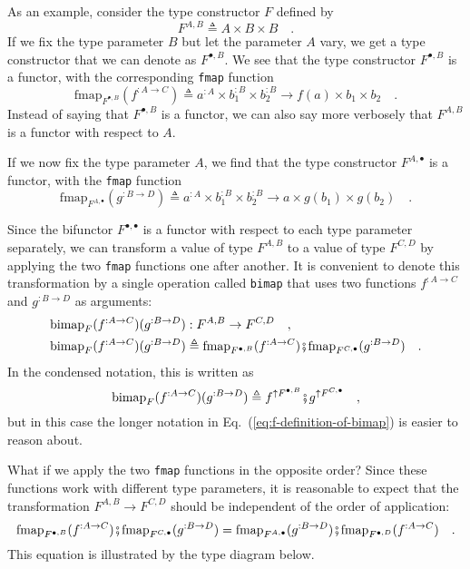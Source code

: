 As an example, consider the type constructor $F$ defined by
\[
F^{A,B}\triangleq A\times B\times B\quad.
\]
If we fix the type parameter $B$ but let the parameter $A$ vary,
we get a type constructor that we can denote as $F^{\bullet,B}$.
We see that the type constructor $F^{\bullet,B}$ is a functor, with
the corresponding \lstinline!fmap! function
\[
\text{fmap}_{F^{\bullet,B}}(f^{:A\rightarrow C})\triangleq a^{:A}\times b_{1}^{:B}\times b_{2}^{:B}\rightarrow f(a)\times b_{1}\times b_{2}\quad.
\]
Instead of saying that $F^{\bullet,B}$ is a functor, we can also
say more verbosely that $F^{A,B}$ is a functor with respect to $A$. 

If we now fix the type parameter $A$, we find that the type constructor
$F^{A,\bullet}$ is a functor, with the \lstinline!fmap! function
\[
\text{fmap}_{F^{A,\bullet}}(g^{:B\rightarrow D})\triangleq a^{:A}\times b_{1}^{:B}\times b_{2}^{:B}\rightarrow a\times g(b_{1})\times g(b_{2})\quad.
\]

Since the bifunctor $F^{\bullet,\bullet}$ is a functor with respect
to each type parameter separately, we can transform a value of type
$F^{A,B}$ to a value of type $F^{C,D}$ by applying the two \lstinline!fmap!
functions one after another. It is convenient to denote this transformation
by a single operation called \lstinline!bimap! that uses two functions
$f^{:A\rightarrow C}$ and $g^{:B\rightarrow D}$ as arguments:
\begin{align}
\text{bimap}_{F}(f^{:A\rightarrow C})(g^{:B\rightarrow D}) & :F^{A,B}\rightarrow F^{C,D}\quad,\nonumber \\
\text{bimap}_{F}(f^{:A\rightarrow C})(g^{:B\rightarrow D}) & \triangleq\text{fmap}_{F^{\bullet,B}}(f^{:A\rightarrow C})\bef\text{fmap}_{F^{C,\bullet}}(g^{:B\rightarrow D})\quad.\label{eq:f-definition-of-bimap}
\end{align}
In the condensed notation, this is written as
\[
\text{bimap}_{F}(f^{:A\rightarrow C})(g^{:B\rightarrow D})\triangleq f^{\uparrow F^{\bullet,B}}\bef g^{\uparrow F^{C,\bullet}}\quad,
\]
but in this case the longer notation in Eq.~(\ref{eq:f-definition-of-bimap})
is easier to reason about. 

What if we apply the two \lstinline!fmap! functions in the opposite
order? Since these functions work with different type parameters,
it is reasonable to expect that the transformation $F^{A,B}\rightarrow F^{C,D}$
should be independent of the order of application:
\begin{equation}
\text{fmap}_{F^{\bullet,B}}(f^{:A\rightarrow C})\bef\text{fmap}_{F^{C,\bullet}}(g^{:B\rightarrow D})=\text{fmap}_{F^{A,\bullet}}(g^{:B\rightarrow D})\bef\text{fmap}_{F^{\bullet,D}}(f^{:A\rightarrow C})\quad.\label{eq:f-fmap-fmap-bifunctor-commutativity}
\end{equation}
This equation is illustrated by the type diagram below.

